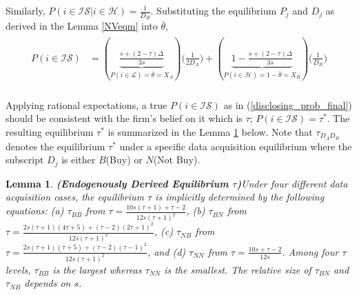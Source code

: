 \documentclass[12pt]{article}
\newtheorem{lemma}{Lemma}
\begin{document}
Similarly, $P(i \in \mathcal{IS}|i \in \mathcal{H})=\frac{1}{D_B}$. Substituting the equilibrium $P_j$ and $D_j$ as derived in the Lemma \ref{NVeqm} into $\bar{\theta}$, 
\begin{align}\label{disclosing_prob_final}
\begin{aligned}
P(i \in \mathcal{IS}) & = (\underbrace{\frac{s+(2-\tau)\Delta}{3s}}_{P(i\in\mathcal{L})=\bar{\theta}=X_A}) \big(\frac{1}{2 D_A}\big)+(\underbrace{1- \frac{s+(2-\tau)\Delta}{3s}}_{P(i\in\mathcal{H})=1-\bar{\theta}=X_B})  \big(\frac{1}{D_B}\big)\\
\end{aligned}
\end{align} 

Applying rational expectations, a true $P(i \in \mathcal{IS})$ as in (\ref{disclosing_prob_final}) should be consistent with the firm's belief on it which is $\tau$; $P(i \in \mathcal{IS})=\tau^*$. The resulting equilibrium $\tau^*$ is summarized in the Lemma \ref{endogenous_tau} below. Note that $\tau_{D_AD_B}$ denotes the equilibrium $\tau^*$ under a specific data acquisition equilibrium where the subscript $D_j$ is either $B$(Buy) or $N$(Not Buy).
\begin{lemma}\textbf{(Endogenously Derived Equilibrium $\tau$)}\label{endogenous_tau}
	Under four different data acquisition cases, the equilibrium $\tau$ is implicitly determined by the following equations: (a) $\tau_{BB}$ from $\tau =\frac{10 s (\tau +1)+\tau -2}{12 s (\tau +1)^2}$, (b) $\tau_{BN}$ from $\tau =\frac{2 s (\tau +1) (4 \tau +5)+(\tau -2) (2 \tau +1)^2}{12 s (\tau +1)^2}$, (c) $\tau_{NB}$ from $\tau =\frac{2 s (\tau +1) (\tau +5)+(\tau -2) (\tau -1)^2}{12 s (\tau +1)^2}$, and (d) $\tau_{NN}$ from $\tau =\frac{10 s+\tau -2}{12 s}$. Among four $\tau$ levels, $\tau_{BB}$ is the largest whereas $\tau_{NN}$ is the smallest. The relative size of $\tau_{BN}$ and $\tau_{NB}$ depends on $s$.
\end{lemma}
\end{document}
